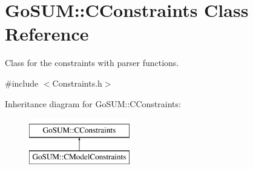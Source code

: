 \hypertarget{class_go_s_u_m_1_1_c_constraints}{\section{Go\-S\-U\-M\-:\-:C\-Constraints Class Reference}
\label{class_go_s_u_m_1_1_c_constraints}
}


Class for the constraints with parser functions.  




{\ttfamily \#include $<$Constraints.\-h$>$}

Inheritance diagram for Go\-S\-U\-M\-:\-:C\-Constraints\-:\begin{figure}[H]
\begin{center}
\leavevmode
\includegraphics[height=2.000000cm]{class_go_s_u_m_1_1_c_constraints}
\end{center}
\end{figure}
